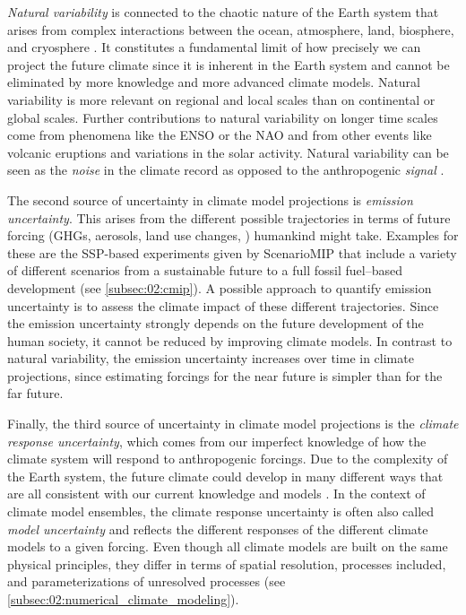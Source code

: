 \emph{Natural variability} is connected to the chaotic nature of the Earth
system that arises from complex interactions between the ocean, atmosphere,
land, biosphere, and cryosphere \autocite{Cubasch2013}. It constitutes a
fundamental limit of how precisely we can project the future climate since it
is inherent in the Earth system and cannot be eliminated by more knowledge and
more advanced climate models. Natural variability is more relevant on regional
and local scales than on continental or global scales. Further contributions to
natural variability on longer time scales come from phenomena like the
\ac{ENSO} or the \ac{NAO} and from other events like volcanic eruptions and
variations in the solar activity. Natural variability can be seen as the
\emph{noise} in the climate record as opposed to the anthropogenic
\emph{signal} \autocite{Cubasch2013}.

The second source of uncertainty in climate model projections is \emph{emission
  uncertainty}. This arises from the different possible trajectories in terms
of future forcing (\acp{GHG}, aerosols, land use changes, \etc{}) humankind
might take. Examples for these are the \acs{SSP}-based experiments given by
\ac{ScenarioMIP} that include a variety of different scenarios from a
sustainable future to a full fossil fuel--based development (see
\cref{subsec:02:cmip}). A possible approach to quantify emission uncertainty is
to assess the climate impact of these different trajectories. Since the
emission uncertainty strongly depends on the future development of the human
society, it cannot be reduced by improving climate models. In contrast to
natural variability, the emission uncertainty increases over time in climate
projections, since estimating forcings for the near future is simpler than for
the far future.

Finally, the third source of uncertainty in climate model projections is the
\emph{climate response uncertainty}, which comes from our imperfect knowledge
of how the climate system will respond to anthropogenic forcings. Due to the
complexity of the Earth system, the future climate could develop in many
different ways that are all consistent with our current knowledge and models
\autocite{Cubasch2013}. In the context of climate model ensembles, the climate
response uncertainty is often also called \emph{model uncertainty} and reflects
the different responses of the different climate models to a given forcing.
Even though all climate models are built on the same physical principles, they
differ in terms of spatial resolution, processes included, and
parameterizations of unresolved processes (see
\cref{subsec:02:numerical_climate_modeling}).


